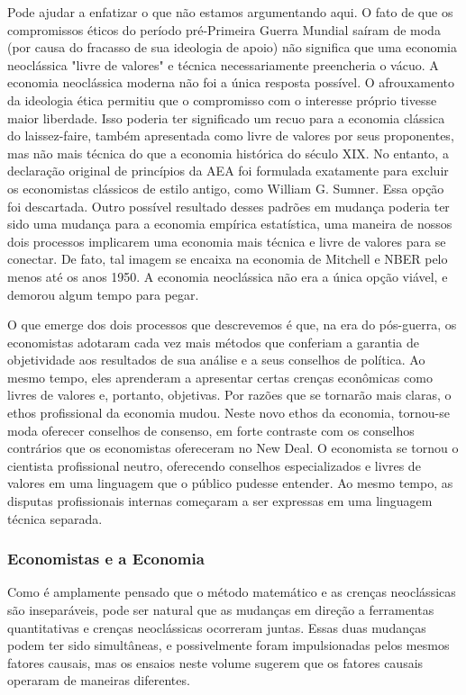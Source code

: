 \documentclass[12pt]{article}
\begin{document}
Pode ajudar a enfatizar o que não estamos argumentando aqui. O fato de que os compromissos éticos do período pré-Primeira Guerra Mundial saíram de moda (por causa do fracasso de sua ideologia de apoio) não significa que uma economia neoclássica "livre de valores" e técnica necessariamente preencheria o vácuo. A economia neoclássica moderna não foi a única resposta possível. O afrouxamento da ideologia ética permitiu que o compromisso com o interesse próprio tivesse maior liberdade. Isso poderia ter significado um recuo para a economia clássica do laissez-faire, também apresentada como livre de valores por seus proponentes, mas não mais técnica do que a economia histórica do século XIX. No entanto, a declaração original de princípios da AEA foi formulada exatamente para excluir os economistas clássicos de estilo antigo, como William G. Sumner. Essa opção foi descartada. Outro possível resultado desses padrões em mudança poderia ter sido uma mudança para a economia empírica estatística, uma maneira de nossos dois processos implicarem uma economia mais técnica e livre de valores para se conectar. De fato, tal imagem se encaixa na economia de Mitchell e NBER pelo menos até os anos 1950. A economia neoclássica não era a única opção viável, e demorou algum tempo para pegar.

O que emerge dos dois processos que descrevemos é que, na era do pós-guerra, os economistas adotaram cada vez mais métodos que conferiam a garantia de objetividade aos resultados de sua análise e a seus conselhos de política. Ao mesmo tempo, eles aprenderam a apresentar certas crenças econômicas como livres de valores e, portanto, objetivas. Por razões que se tornarão mais claras, o ethos profissional da economia mudou. Neste novo ethos da economia, tornou-se moda oferecer conselhos de consenso, em forte contraste com os conselhos contrários que os economistas ofereceram no New Deal. O economista se tornou o cientista profissional neutro, oferecendo conselhos especializados e livres de valores em uma linguagem que o público pudesse entender. Ao mesmo tempo, as disputas profissionais internas começaram a ser expressas em uma linguagem técnica separada.

\subsubsection{\textbf{Economistas e a Economia}}
Como é amplamente pensado que o método matemático e as crenças neoclássicas são inseparáveis, pode ser natural que as mudanças em direção a ferramentas quantitativas e crenças neoclássicas ocorreram juntas. Essas duas mudanças podem ter sido simultâneas, e possivelmente foram impulsionadas pelos mesmos fatores causais, mas os ensaios neste volume sugerem que os fatores causais operaram de maneiras diferentes.
\end{document}

